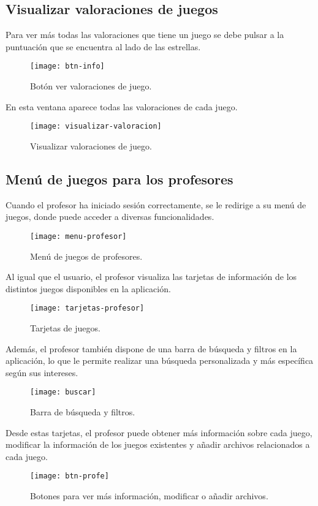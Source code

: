 \subsection{Visualizar valoraciones de juegos}
Para ver más todas las valoraciones que tiene un juego se debe pulsar a la puntuación que se encuentra al lado de las estrellas.
\newpage
\begin{figure}[htb]
\centering
\texttt{[image: btn-info]}
\caption{Botón ver valoraciones de juego.}
\label{fig:btn-info}
\end{figure}

En esta ventana aparece todas las valoraciones de cada juego.
\begin{figure}[htb]
\centering
\texttt{[image: visualizar-valoracion]}
\caption{Visualizar valoraciones de juego.}
\label{fig:visualizar-valoracion}
\end{figure}

\subsection{Menú de juegos para los profesores}
Cuando el profesor ha iniciado sesión correctamente, se le redirige a su menú de juegos, donde puede acceder a diversas funcionalidades.
\newpage
\begin{figure}[htb]
\centering
\texttt{[image: menu-profesor]}
\caption{Menú de juegos de profesores.}
\label{fig:menu-profesor}
\end{figure}

Al igual que el usuario, el profesor visualiza las tarjetas de información de los distintos juegos disponibles en la aplicación. 
\begin{figure}[htb]
\centering
\texttt{[image: tarjetas-profesor]}
\caption{Tarjetas de juegos.}
\label{fig:tarjetas-profesor}
\end{figure}

Además, el profesor también dispone de una barra de búsqueda y filtros en la aplicación, lo que le permite realizar una búsqueda personalizada y más específica según sus intereses.
\newpage
\begin{figure}[htb]
\centering
\texttt{[image: buscar]}
\caption{Barra de búsqueda y filtros.}
\label{fig:buscar}
\end{figure}

Desde estas tarjetas, el profesor puede obtener más información sobre cada juego, modificar la información de los juegos existentes y añadir archivos relacionados a cada juego.
\begin{figure}[htb]
\centering
\texttt{[image: btn-profe]}
\caption{Botones para ver más información, modificar o añadir archivos.}
\label{fig:btn-profe}
\end{figure}


